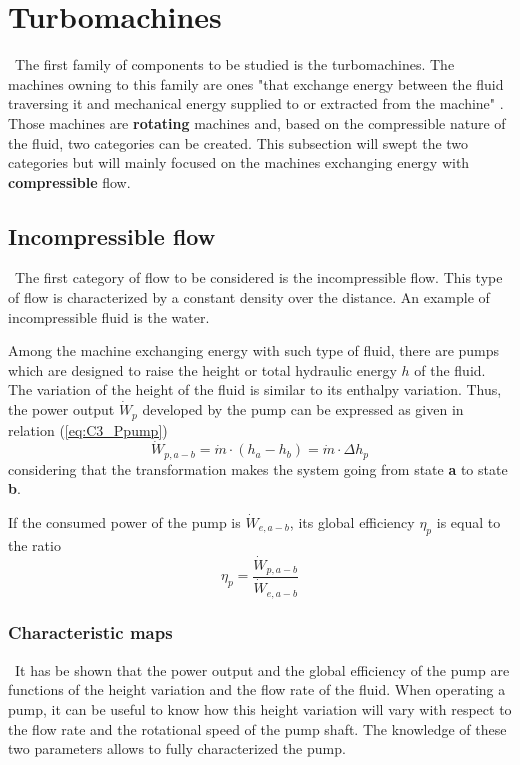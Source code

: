 \graphicspath{{Chapter_3_-_Thermodynamic_components/Images/}}
\section{Turbomachines}
\quad\, The first family of components to be studied is the turbomachines. The machines owning to this family are ones "that exchange energy between the
fluid traversing it and mechanical energy supplied to or extracted from the machine" \cite{Hillewaert2019}. Those machines are \textbf{rotating} machines and, based on the compressible nature of the fluid, two categories can be created.
This subsection will swept the two categories but will mainly focused on the machines exchanging energy with \textbf{compressible} flow.

\subsection{Incompressible flow}
\quad\, The first category of flow to be considered is the incompressible flow. This type of flow is characterized by a constant density over the distance. An example of incompressible fluid is the water.

Among the machine exchanging energy with such type of fluid, there are pumps which are designed to raise the height or total hydraulic energy $h$ of the fluid. The variation of the height of the fluid is similar to its enthalpy variation. Thus, the power output  $\dot{W}_p$ developed by the pump can be expressed as given in relation (\ref{eq:C3_Ppump})
\begin{equation}
\dot{W}_{p,a-b} = \dot{m}\cdot (h_a - h_b)=\dot{m}\cdot\Delta h_p \label{eq:C3_Ppump}
\end{equation}
considering that the transformation makes the system going from state \textbf{a} to state \textbf{b}.

If the consumed power of the pump is $\dot{W}_{e,a-b}$, its global efficiency $\eta_p$ is equal to the ratio
\begin{equation}
\eta_p = \frac{\dot{W}_{p,a-b}}{\dot{W}_{e,a-b}}\label{eq:C3_Etapump}
\end{equation}
\subsubsection{Characteristic maps}
\quad\, It has be shown that the power output and the global efficiency of the pump are functions of the height variation and the flow rate of the fluid. When operating a pump, it can be useful to know how this height variation will vary with respect to the flow rate and the rotational speed of the pump shaft. The knowledge of these two parameters allows to fully characterized the pump.

